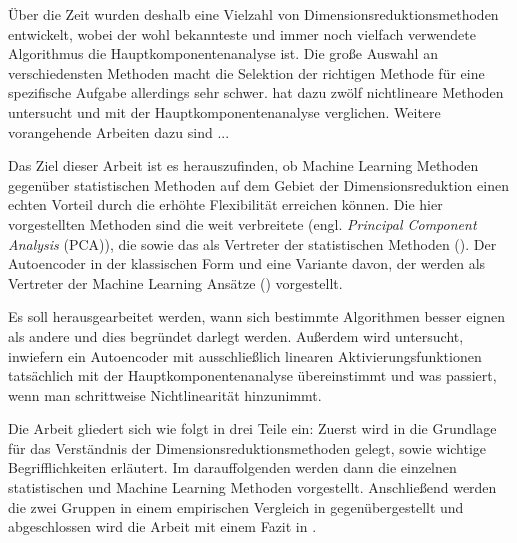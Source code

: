 Über die Zeit wurden deshalb eine Vielzahl von Dimensionsreduktionsmethoden entwickelt,
wobei der wohl bekannteste und immer noch vielfach verwendete Algorithmus die
Hauptkomponentenanalyse ist. Die große Auswahl an verschiedensten Methoden macht die Selektion der richtigen Methode für eine spezifische Aufgabe allerdings sehr schwer. \textcite{vanderMaaten.2008} hat dazu zwölf nichtlineare Methoden untersucht und mit der Hauptkomponentenanalyse verglichen. Weitere vorangehende Arbeiten dazu sind ...

Das Ziel dieser Arbeit ist es herauszufinden, ob Machine Learning Methoden gegenüber statistischen
Methoden auf dem Gebiet der Dimensionsreduktion einen echten Vorteil durch die erhöhte Flexibilität
erreichen können. Die hier vorgestellten Methoden sind die weit verbreitete
 (engl. \textit{Principal Component Analysis} (PCA)), die
 sowie das  als Vertreter der statistischen
Methoden (). Der Autoencoder in der klassischen Form und
eine Variante davon, der  werden als Vertreter der Machine
Learning Ansätze () vorgestellt.

Es soll herausgearbeitet werden, wann sich bestimmte Algorithmen besser eignen als andere und dies
begründet darlegt werden. Außerdem wird untersucht, inwiefern ein Autoencoder mit ausschließlich
linearen Aktivierungsfunktionen tatsächlich mit der Hauptkomponentenanalyse übereinstimmt und was
passiert, wenn man schrittweise Nichtlinearität hinzunimmt.

Die Arbeit gliedert sich wie folgt in drei Teile ein: Zuerst wird in
 die Grundlage für das Verständnis der Dimensionsreduktionsmethoden
gelegt, sowie wichtige Begrifflichkeiten erläutert. Im darauffolgenden
 werden dann die einzelnen statistischen und Machine Learning
Methoden vorgestellt. Anschließend werden die zwei Gruppen in einem empirischen Vergleich in
 gegenübergestellt und abgeschlossen wird die Arbeit mit einem Fazit in
.
